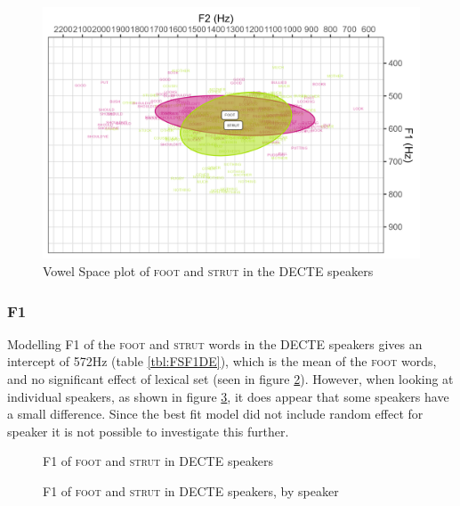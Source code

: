 \documentclass[12pt,a4paper,notitlepage,
bibliography=totoc,
numbers=endperiod,
appendixprefix=true,
usenames,dvipsnames]{scrartcl}
\let\Oldsubsubsection\subsubsection
\renewcommand{\subsubsection}{\FloatBarrier\Oldsubsubsection}
\newcommand{\scs}{\textsc}
\newcommand{\foot}{\scs{foot}}
\newcommand{\strutt}{\scs{strut}}
\begin{document}
\begin{figure}[h]
	\centering
	\includegraphics[width=\textwidth]{../figures/FS-DE-vplot.png}
	\caption{Vowel Space plot of \foot{} and \strutt{} in the DECTE speakers} \label{fig:FSvplotDE}
\end{figure}

\subsubsection{F1}
Modelling F1 of the \foot{} and \strutt{} words in the DECTE speakers gives an intercept of 572Hz (table \ref{tbl:FSF1DE}), which is the mean of the \foot{} words, and no significant effect of lexical set (seen in figure \ref{fig:FSF1DE}). However, when looking at individual speakers, as shown in figure \ref{fig:FSF1DE-id}, it does appear that some speakers have a small difference. Since the best fit model did not include random effect for speaker it is not possible to investigate this further.



\begin{figure}
	\centering
	
	\caption{F1 of \foot{} and \strutt{} in DECTE speakers} \label{fig:FSF1DE}
\end{figure}

\begin{figure}
	\centering
	
	\caption{F1 of \foot{} and \strutt{} in DECTE speakers, by speaker} \label{fig:FSF1DE-id}
\end{figure}
\end{document}
